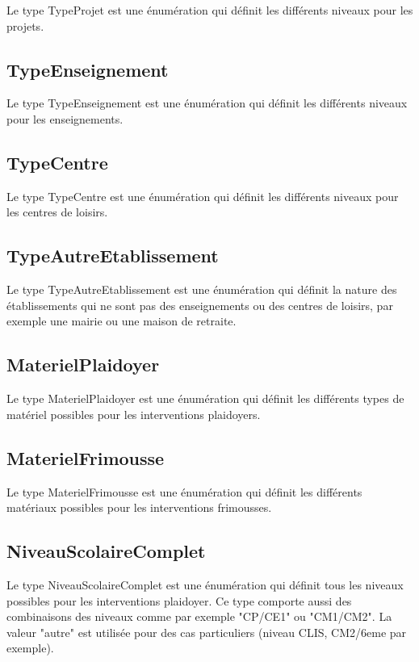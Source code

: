 \documentclass[asi, sansVersion]{picInsa}
\begin{document}
Le type TypeProjet est une énumération qui définit les différents niveaux pour les projets.

\subsection*{TypeEnseignement}

Le type TypeEnseignement est une énumération qui définit les différents niveaux pour les enseignements.

\subsection*{TypeCentre}

Le type TypeCentre est une énumération qui définit les différents niveaux pour les centres de loisirs.

\subsection*{TypeAutreEtablissement}

Le type TypeAutreEtablissement est une énumération qui définit la nature des établissements qui ne sont pas des enseignements ou des centres de loisirs, par exemple une mairie ou une maison de retraite.

\subsection*{MaterielPlaidoyer}

Le type MaterielPlaidoyer est une énumération qui définit les différents types de matériel possibles pour les interventions plaidoyers.

\subsection*{MaterielFrimousse}

Le type MaterielFrimousse est une énumération qui définit les différents matériaux possibles pour les interventions frimousses.

\subsection*{NiveauScolaireComplet}

Le type NiveauScolaireComplet est une énumération qui définit tous les niveaux possibles pour les interventions plaidoyer. Ce type comporte aussi des combinaisons des niveaux comme par exemple "CP/CE1" ou "CM1/CM2". La valeur "autre" est utilisée pour des cas particuliers (niveau CLIS, CM2/6eme par exemple).
\end{document}

